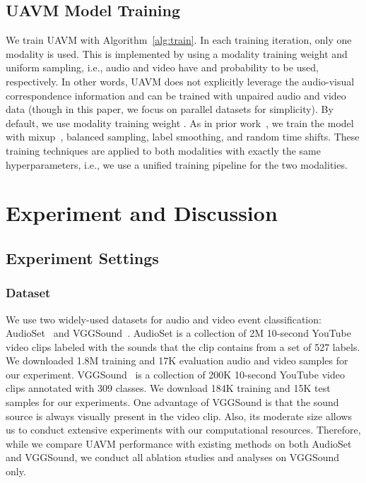 \documentclass[journal]{IEEEtran}
\newcommand{\squeezeup}{\vspace{-1.6mm}}
\begin{document}
\subsection{UAVM Model Training}
We train UAVM with Algorithm~\ref{alg:train}. In each training iteration, only one modality is used. This is implemented by using a modality training weight  and uniform sampling, i.e., audio and video have  and  probability to be used, respectively. In other words, UAVM does not explicitly leverage the audio-visual correspondence information and can be trained with unpaired audio and video data (though in this paper, we focus on parallel datasets for simplicity).  By default, we use modality training weight . As in prior work~\cite{gong21b_interspeech,gong_psla,nagrani2021attention}, we train the model with mixup~\cite{zhang2018mixup}, balanced sampling, label smoothing, and random time shifts. These training techniques are applied to both modalities with exactly the same hyperparameters, i.e., we use a unified training pipeline for the two modalities.

\squeezeup
\section{Experiment and Discussion}

\subsection{Experiment Settings}

\subsubsection{Dataset}

We use two widely-used datasets for audio and video event classification: AudioSet~\cite{gemmeke2017audio} and VGGSound~\cite{chen2020vggsound}. AudioSet is a collection of 2M 10-second YouTube video clips labeled with the sounds that the clip contains from a set of 527 labels. We downloaded 1.8M training and 17K evaluation audio and video samples for our experiment. VGGSound~\cite{chen2020vggsound} is a collection of 200K 10-second YouTube video clips annotated with 309 classes. We download 184K training and 15K test samples for our experiments. One advantage of VGGSound is that the sound source is always visually present in the video clip. Also, its moderate size allows us to conduct extensive experiments with our computational resources. Therefore, while we compare UAVM performance with existing methods on both AudioSet and VGGSound, we conduct all ablation studies and analyses on VGGSound only.
\end{document}
